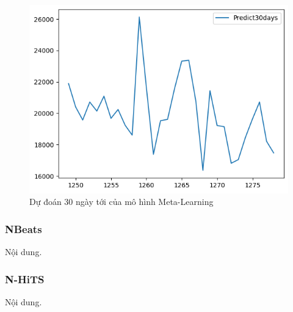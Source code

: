 \begin{figure}[H]
\begin{minipage}{0.15\textwidth}
    \includegraphics[width=1\textwidth]{resources/chapter-5/predicted/EXB_ML_9_1_next30days.png}
    \end{minipage}
    \hfill
    
    \caption{Dự đoán 30 ngày tới của mô hình Meta-Learning}
    \label{fig:ml_predicted}
\end{figure}





\subsubsection{NBeats}
Nội dung.




\subsubsection{N-HiTS}
Nội dung.


